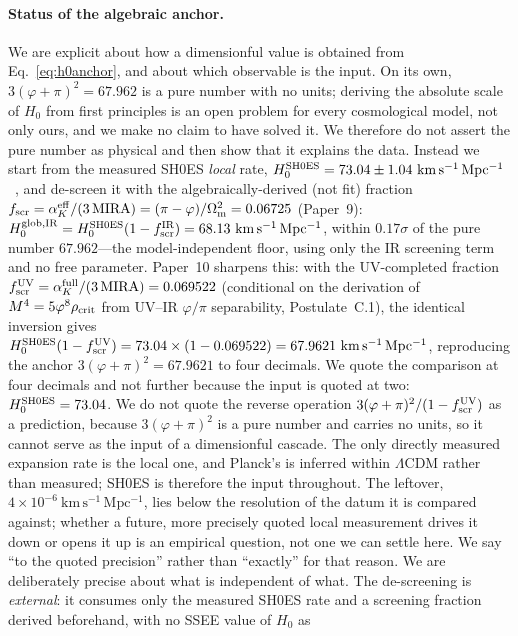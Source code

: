 \documentclass[a4paper,11pt]{article}
\newcommand{\kms}{\mathrm{km\,s^{-1}\,Mpc^{-1}}}
\newcommand{\Om}{\Omega_{\mathrm{m}}}
\begin{document}
\paragraph{Status of the algebraic anchor.} We are explicit about how a
dimensionful value is obtained from Eq.~\eqref{eq:h0anchor}, and about which
observable is the input. On its own, $3(\varphi+\pi)^2=67.962$ is a pure
number with no units; deriving the absolute scale of $H_0$ from first
principles is an open problem for every cosmological model, not only ours,
and we make no claim to have solved it. We therefore do not assert the pure
number as physical and then show that it explains the data. Instead we start
from the measured SH0ES \emph{local} rate,
$H_0^{\rm SH0ES}=73.04\pm1.04~\kms$~\citep{Riess2022}, and de-screen it with
the algebraically-derived (not fit) fraction $f_{\rm scr}=\alpha_K^{\rm eff}/(3\,\mathrm{MIRA})=(\pi-\varphi)/\Om^2=0.06725$
(Paper~9): $H_0^{\rm glob,IR}=H_0^{\rm SH0ES}(1-f_{\rm scr}^{\rm IR})=68.13~\kms$, within $0.17\sigma$ of
the pure number $67.962$---the model-independent floor, using only the IR
screening term and no free parameter. Paper~10 sharpens this: with the
UV-completed fraction $f_{\rm scr}^{\rm UV}=\alpha_K^{\rm full}/(3\,\mathrm{MIRA})=0.069522$
(conditional on the derivation of $M^4=5\varphi^8\rho_{\rm crit}$ from UV--IR
$\varphi/\pi$ separability, Postulate~C.1), the identical inversion gives
$H_0^{\rm SH0ES}(1-f_{\rm scr}^{\rm UV})=73.04\times(1-0.069522)=67.9621~\kms$,
reproducing the anchor $3(\varphi+\pi)^2=67.9621$ to four decimals. We quote the
comparison at four decimals and not further because the input is quoted at two:
$H_0^{\rm SH0ES}=73.04$. We do not quote the reverse operation $3(\varphi+\pi)^2/(1-f_{\rm scr}^{\rm UV})$ as a prediction, because $3(\varphi+\pi)^2$
is a pure number and carries no units, so it cannot serve as the input of a
dimensionful cascade. The only directly measured expansion rate is the local
one, and Planck's is inferred within $\Lambda$CDM rather than measured; SH0ES
is therefore the input throughout. The leftover, $4\times10^{-6}~\kms$, lies below the resolution of
the datum it is compared against; whether a future, more precisely quoted local
measurement drives it down or opens it up is an empirical question, not one we
can settle here. We say ``to the quoted precision'' rather than ``exactly''
for that reason. We are deliberately precise about what is independent of what.
The de-screening is \emph{external}: it consumes only the measured SH0ES rate
and a screening fraction derived beforehand, with no SSEE value of $H_0$ as
\end{document}
